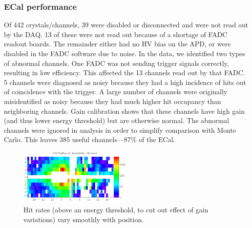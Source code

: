 
\subsubsection{ECal performance}


Of 442 crystals/channels, 39 were disabled or disconnected and were not read out by the DAQ. 
13 of these were not read out because of a shortage of FADC readout boards.
The remainder either had no HV bias on the APD, or were disabled in the FADC software due to noise.
In the data, we identified two types of abnormal channels. 
One FADC was not sending trigger signals correctly, resulting in low efficiency. This affected the 13 channels read out by that FADC.
5 channels were diagnosed as noisy because they had a high incidence of hits out of coincidence with the trigger.
A large number of channels were originally misidentified as noisy because they had much higher hit occupancy than neighboring channels.
Gain calibration shows that these channels have high gain (and thus lower energy threshold) but are otherwise normal.
The abnormal channels were ignored in analysis in order to simplify comparison with Monte Carlo. This leaves 385 useful channels---87\% of the ECal.


\begin{figure}[ht]
	\includegraphics[width=0.5\textwidth]{test2012/ecalperformance/hitrates}
	\caption{\small{Hit rates (above an energy threshold, to cut out effect of gain variations) vary smoothly with position.}}
	\label{fig:hitrates}
\end{figure}

